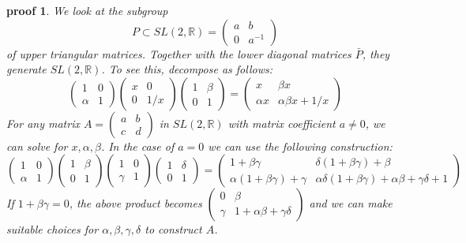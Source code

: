 \documentclass[
  12pt
]{article}
\theoremstyle{plain}
\newtheorem*{pf}{proof}
\begin{document}
  \begin{pf}
    \label{ref:lem:pf:decomp}
    We look at the subgroup
    \[P \subset SL(2, \mathbb{R}) = \begin{pmatrix}a & b \\ 0 & a^{-1}\end{pmatrix}\]
    of upper triangular matrices. Together with the lower diagonal matrices
    $\bar{P}$, they generate $SL(2, \mathbb{R})$. To see this, decompose
    as follows: \[\begin{pmatrix}1&0\\\alpha&1\end{pmatrix}
    \begin{pmatrix}x&0\\0&1/x\end{pmatrix}
    \begin{pmatrix}1&\beta\\0&1\end{pmatrix} = 
    \begin{pmatrix} x&\beta x\\\alpha x& \alpha\beta x+1/x\end{pmatrix}\]
    For any matrix $A = \begin{pmatrix}a & b \\ c & d\end{pmatrix}$ in
    $SL(2, \mathbb{R})$ with matrix coefficient $a \neq 0$, we can solve
    for $x,\alpha, \beta$. In the case of $a = 0$ we can use the
    following construction:
    \[
      \begin{pmatrix} 1&0\\\alpha&1\end{pmatrix}
      \begin{pmatrix} 1&\beta\\0&1\end{pmatrix}
      \begin{pmatrix} 1&0\\\gamma&1\end{pmatrix}
      \begin{pmatrix} 1&\delta\\0&1\end{pmatrix}=
      \begin{pmatrix}
        1+\beta\gamma&\delta(1+\beta\gamma)+\beta\\
        \alpha(1+\beta\gamma)+\gamma&\alpha\delta(1+\beta\gamma)+\alpha\beta+\gamma\delta+1
      \end{pmatrix}
    \]
    If $1 + \beta\gamma = 0$, the above product becomes
    $\begin{pmatrix} 0&\beta\\ \gamma& 1+\alpha\beta+\gamma\delta \end{pmatrix}$
    and we can make suitable choices for $\alpha, \beta, \gamma, \delta$
    to construct $A$.


\end{pf}
\end{document}
